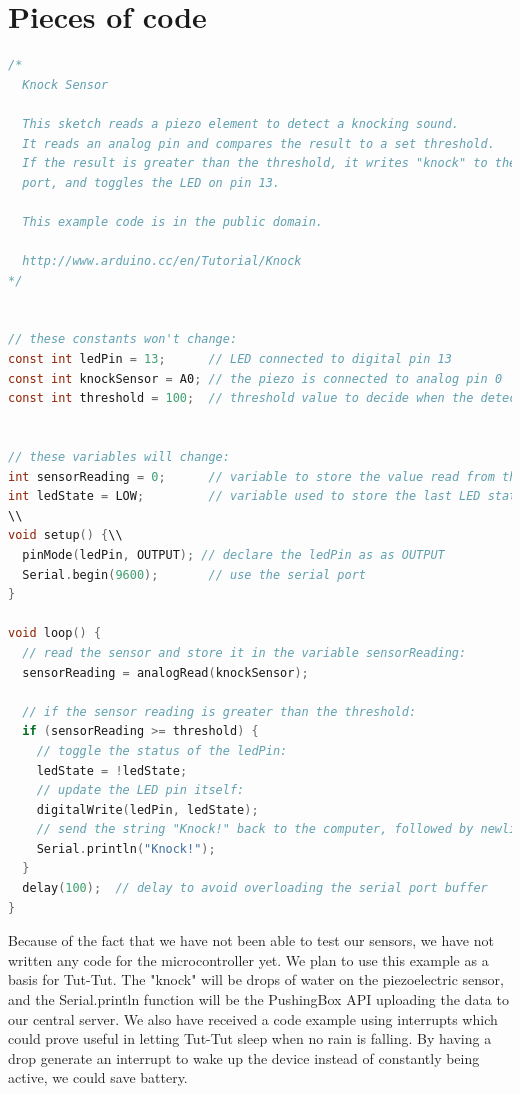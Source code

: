 \documentclass[letterpaper,10pt,draftclsnofoot,onecolumn]{article}
\begin{document}
\section{Pieces of code}
\begin{lstlisting}[language=C]
/*
  Knock Sensor

  This sketch reads a piezo element to detect a knocking sound.
  It reads an analog pin and compares the result to a set threshold.
  If the result is greater than the threshold, it writes "knock" to the serial
  port, and toggles the LED on pin 13.

  This example code is in the public domain.

  http://www.arduino.cc/en/Tutorial/Knock
*/


// these constants won't change:
const int ledPin = 13;      // LED connected to digital pin 13
const int knockSensor = A0; // the piezo is connected to analog pin 0
const int threshold = 100;  // threshold value to decide when the detected sound is a knock or not


// these variables will change:
int sensorReading = 0;      // variable to store the value read from the sensor pin
int ledState = LOW;         // variable used to store the last LED status, to toggle the light
\\
void setup() {\\
  pinMode(ledPin, OUTPUT); // declare the ledPin as as OUTPUT
  Serial.begin(9600);       // use the serial port
}

void loop() {
  // read the sensor and store it in the variable sensorReading:
  sensorReading = analogRead(knockSensor);

  // if the sensor reading is greater than the threshold:
  if (sensorReading >= threshold) {
    // toggle the status of the ledPin:
    ledState = !ledState;
    // update the LED pin itself:
    digitalWrite(ledPin, ledState);
    // send the string "Knock!" back to the computer, followed by newline
    Serial.println("Knock!");
  }
  delay(100);  // delay to avoid overloading the serial port buffer
}
\end{lstlisting}

Because of the fact that we have not been able to test our sensors, we have not written any code for the microcontroller yet. We plan to use this example as a basis for Tut-Tut. The "knock" will be drops of water on the piezoelectric sensor, and the Serial.println function will be the PushingBox API uploading the data to our central server. We also have received a code example using interrupts which could prove useful in letting Tut-Tut sleep when no rain is falling. By having a drop generate an interrupt to wake up the device instead of constantly being active, we could save battery.
\end{document}
